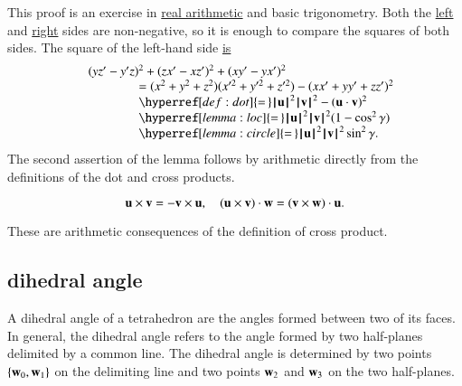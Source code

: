 \begin{proved} This proof is an exercise in
  \hyperref[back:analysis]{real arithmetic} and basic trigonometry.
  Both the \hyperref[eqn:dot]{left} and
  \hyperref[lemma:sin-pos]{right} sides are non-negative, so it is
  enough to compare the squares of both sides.  The square of the
  left-hand side \hyperref[def:cross]{is}
\begin{displaymath}
\begin{array}{lll}
  &(y z'- y'z)^2 + (z x' - x z')^2 + (x y' - y x')^2 \\
  &\qquad\qquad=
  (x^2 + y^2 + z^2)(x'^2 + y'^2 + z'^2) - (x x' + y y' + z z')^2
  \\&\qquad\qquad \hyperref[def:dot]{=\,} 
  \normo{\u}^2\normo{\v}^2 - (\u\cdot \v)^2 \\
  &\qquad\qquad\hyperref[lemma:loc]{=\,} 
  \normo{\u}^2\normo{\v}^2 ( 1 - \cos^2\gamma)\\
  &\qquad\qquad\hyperref[lemma:circle]{=\,} 
\normo{\u}^2\normo{\v}^2 \sin^2\gamma.
\end{array}
\end{displaymath}
The second assertion of the lemma follows by arithmetic directly from
the definitions of the dot and cross products.  \swallowed\end{proved}


\begin{lemma}[]
\begin{displaymath}
{\mathbf u}\times {\mathbf v} = -{\mathbf v}\times {\mathbf u},\quad
({\mathbf u}\times {\mathbf v})\cdot {\mathbf w} = ({\mathbf v}\times {\mathbf w})\cdot {\mathbf u}.
\end{displaymath}
\end{lemma}

\begin{proved}
These are arithmetic consequences of the definition of cross product.
\swallowed\end{proved}



\subsection{dihedral angle}

A dihedral angle of a tetrahedron are the angles formed between two of
its faces. In general, the dihedral angle refers to the angle formed
by two half-planes delimited by a common line.  The dihedral angle is
determined by two points $\{{\mathbf w}_0,{\mathbf w}_1\}$ on the delimiting line and
two points ${\mathbf w}_2$ and ${\mathbf w}_3$ on the two half-planes.
%
%
%
%
%

